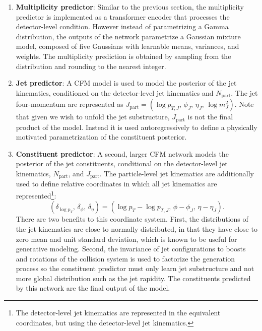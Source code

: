 \begin{enumerate}
  \item \textbf{Multiplicity predictor}: Similar to the previous section, the multiplicity predictor is implemented as a transformer encoder that processes the detector-level condition.
  However instead of parametrizing a Gamma distribution, the outputs of the network parametrize a Gaussian mixture model, composed of five Gaussians with learnable means, variances, and weights.
  The multiplicity prediction is obtained by sampling from the distribution and rounding to the nearest integer.
  \item \textbf{Jet predictor}: A CFM model is used to model the posterior of the jet kinematics, conditioned on the detector-level jet kinematics and $N_\text{part}$.
  The jet four-momentum are represented as $J_\text{part} = (\log p_{T,J},\, \phi_J,\, \eta_J,\, \log m_J^2)$.
  Note that given we wish to unfold the jet substructure, $J_\text{part}$ is not the final product of the model.
  Instead it is used autoregressively to define a physically motivated parametrization of the constituent posterior.
  \item \textbf{Constituent predictor}: A second, larger CFM network models the posterior of the jet constituents, conditional on the detector-level jet kinematics, $N_\text{part}$, and $J_\text{part}$.
  The particle-level jet kinematics are additionally used to define relative coordinates in which all jet kinematics are represented\footnote{The detector-level jet kinematics are represented in the equivalent coordinates, but using the detector-level jet kinematics.}:
  \begin{equation}
    (\delta_{\log p_T},\, \delta_\phi,\, \delta_\eta) = (\log p_T - \log p_{T,J},\, \phi - \phi_J,\, \eta - \eta_J).
    \label{eq:cfm_relative}
  \end{equation}
  There are two benefits to this coordinate system.
  First, the distributions of the jet kinematics are close to normally distributed, in that they have close to zero mean and unit standard deviation, which is known to be useful for generative modeling.
  Second, the invariance of jet configurations to boosts and rotations of the collision system is used to factorize the generation process so the constituent predictor must only learn jet substructure and not more global distribution such as the jet rapidity.
  The constituents predicted by this network are the final output of the model.
\end{enumerate}

